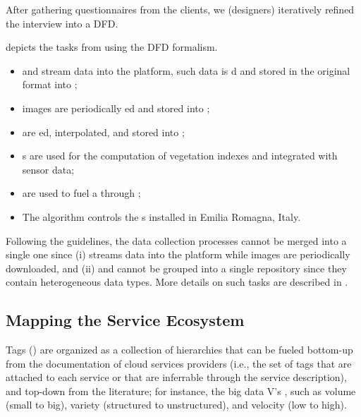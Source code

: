 After gathering questionnaires from the clients, we (designers) iteratively refined the interview into a DFD.
\begin{example}[DFD]
 depicts the tasks from  using the DFD formalism.
\begin{itemize}
    \item {} and  stream data into the platform, such data is d and stored in the original format into ;
    \item {} images are periodically ed and stored into ;
    \item {} are ed, interpolated, and stored into ;
    \item {}s are used for the computation of vegetation indexes and integrated with sensor data;
    \item {} are used to fuel a  through ;
    \item The  algorithm controls the s installed in Emilia Romagna, Italy.
\end{itemize}
Following the guidelines, the data collection processes cannot be merged into a single one since (i)  streams data into the platform while  images are periodically downloaded, and (ii)  and  cannot be grouped into a single repository since they contain heterogeneous data types. More details on such tasks are described in \cite{DBLP:journals/cea/FranciaGG22,baldi2023smart}.
\end{example}

\subsection{Mapping the Service Ecosystem}
\label{sec:pdd-eco}

Tags () are organized as a collection of hierarchies that can be fueled bottom-up from the documentation of cloud services providers (i.e., the set of tags that are attached to each service or that are inferrable through the service description), and top-down from the literature; for instance, the big data V's \cite{anuradha2015brief}, such as volume (small to big), variety (structured to unstructured), and velocity (low to high).

